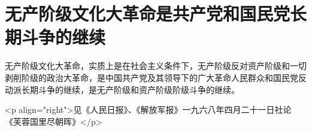 \section[无产阶级文化大革命是共产党和国民党长期斗争的继续（一九六八年三月）]{无产阶级文化大革命是共产党和国民党长期斗争的继续}


无产阶级文化大革命，实质上是在社会主义条件下，无产阶级反对资产阶级和一切剥削阶级的政治大革命，是中国共产党及其领导下的广大革命人民群众和国民党反动派长期斗争的继续，是无产阶级和资产阶级阶级斗争的继续。

<p align="right">见《人民日报》、《解放军报》一九六八年四月二十一日社论《芙蓉国里尽朝晖》</p>


